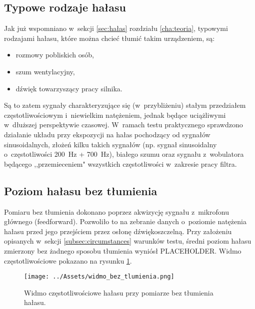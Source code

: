 \subsection{Typowe rodzaje hałasu}
Jak już wspomniano w~sekcji \ref{sec:hałas} rozdziału \ref{cha:teoria}, typowymi rodzajami hałasu, które można chcieć tłumić takim urządzeniem, są:
\begin{itemize}
	\item rozmowy pobliskich osób,
	\item szum wentylacyjny,
	\item dźwięk towarzyszący pracy silnika.
\end{itemize}
Są to zatem sygnały charakteryzujące się (w~przybliżeniu) stałym przedziałem częstotliwościowym i~niewielkim natężeniem, jednak będące uciążliwymi w~dłuższej perspektywie czasowej. W~ramach testu praktycznego sprawdzono działanie układu przy ekspozycji na hałas pochodzący od sygnałów sinusoidalnych, złożeń kilku takich sygnałów (np. sygnał sinusoidalny o~częstotliwości \SI{200}{\Hz} + \SI{700}{\Hz}), białego szumu oraz sygnału z~wobulatora będącego ,,przemieceniem" wszystkich częstotliwości w~zakresie pracy filtra.
\subsection{Poziom hałasu bez tłumienia}
Pomiaru bez tłumienia dokonano poprzez akwizycję sygnału z~mikrofonu głównego (feedforward). Pozwoliło to na zebranie danych o~poziomie natężenia hałasu przed jego przejściem przez osłonę dźwiękoszczelną. Przy założeniu opisanych w~sekcji \ref{subsec:circumstances} warunków testu, średni poziom hałasu zmierzony bez żadnego sposobu tłumienia wyniósł PLACEHOLDER. %
Widmo częstotliwościowe pokazano na rysunku \ref{fig:widmo_bez}.
\begin{figure}[h!]
	\centering
	\texttt{[image: ../Assets/widmo\_bez\_tlumienia.png]}
	\caption{Widmo częstotliwościowe hałasu przy pomiarze bez tłumienia hałasu.}
	\label{fig:widmo_bez}
\end{figure}

